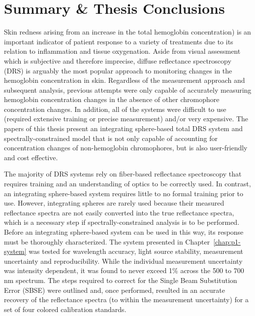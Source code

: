 \section{Summary \& Thesis Conclusions}
Skin redness arising from an increase in the total hemoglobin concentration) is an important indicator of patient response to a variety of treatments due to its relation to inflammation and tissue oxygenation. Aside from visual assessment which is subjective and therefore imprecise, diffuse reflectance spectroscopy (DRS) is arguably the most popular approach to monitoring changes in the hemoglobin concentration in skin. Regardless of the measurement approach and subsequent analysis, previous attempts were only capable of accurately measuring hemoglobin concentration changes in the absence of other chromophore concentration changes. In addition, all of the systems were difficult to use (required extensive training or precise measurement) and/or very expensive. The papers of this thesis present an integrating sphere-based total DRS system and spectrally-constrained model that is not only capable of accounting for concentration changes of non-hemoglobin chromophores, but is also user-friendly and cost effective.

The majority of DRS systems rely on fiber-based reflectance spectroscopy that requires training and an understanding of optics to be correctly used. In contrast, an integrating sphere-based system requires little to no formal training prior to use. However, integrating spheres are rarely used because their measured reflectance spectra are not easily converted into the true reflectance spectra, which is a necessary step if spectrally-constrained analysis is to be performed. Before an integrating sphere-based system can be used in this way, its response must be thoroughly characterized. The system presented in Chapter~\ref{chap:p1-system} was tested for wavelength accuracy, light source stability, measurement uncertainty and reproducibility. While the individual measurement uncertainty was intensity dependent, it was found to never exceed 1\% across the 500 to 700 nm spectrum. The steps required to correct for the Single Beam Substitution Error (SBSE) were outlined and, once performed, resulted in an accurate recovery of the reflectance spectra (to within the measurement uncertainty) for a set of four colored calibration standards.


